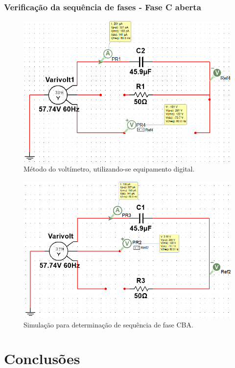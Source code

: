 \documentclass[a4paper,12pt,oneside,openany,table,xcdraw]{article}
\begin{document}
\subsubsection{Verificação da sequência de fases - Fase C aberta}
\begin{figure}[H]
\centering
\includegraphics[width=13cm]{m3-sim-abc}
\caption{Método do voltímetro, utilizando-se equipamento digital.}
\label{m3:sim:abc}
\end{figure}

\vspace{0.2cm}
\begin{figure}[H]
\centering
\includegraphics[width=13cm]{m3-sim-cba}
\caption{Simulação para determinação de sequência de fase CBA.}
\label{m3:sim:cba}
\end{figure}

\newpage
\section{Conclusões} %
\end{document}
